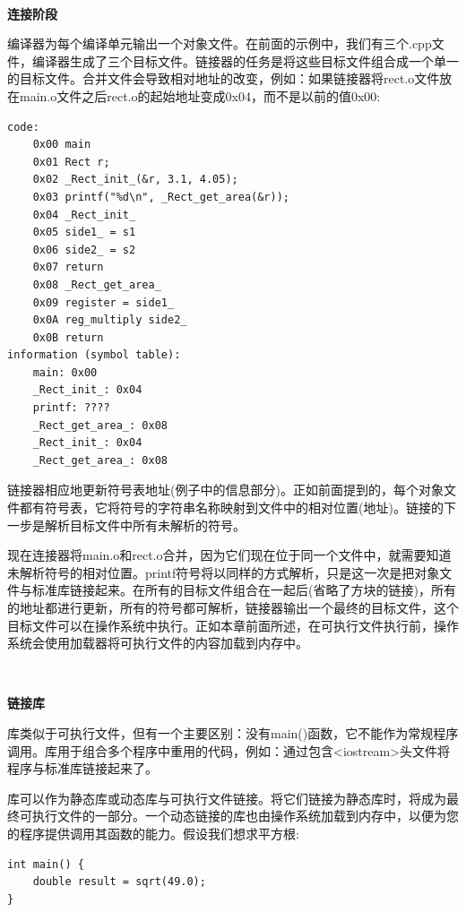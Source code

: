 \noindent\textbf{}\ \par
\textbf{连接阶段}\ \par
编译器为每个编译单元输出一个对象文件。在前面的示例中，我们有三个.cpp文件，编译器生成了三个目标文件。链接器的任务是将这些目标文件组合成一个单一的目标文件。合并文件会导致相对地址的改变，例如：如果链接器将rect.o文件放在main.o文件之后rect.o的起始地址变成0x04，而不是以前的值0x00:\par

\begin{lstlisting}[caption={}]
code:
	0x00 main
	0x01 Rect r;
	0x02 _Rect_init_(&r, 3.1, 4.05);
	0x03 printf("%d\n", _Rect_get_area(&r));
	0x04 _Rect_init_
	0x05 side1_ = s1
	0x06 side2_ = s2
	0x07 return
	0x08 _Rect_get_area_
	0x09 register = side1_
	0x0A reg_multiply side2_
	0x0B return
information (symbol table):
	main: 0x00
	_Rect_init_: 0x04
	printf: ????
	_Rect_get_area_: 0x08
	_Rect_init_: 0x04
	_Rect_get_area_: 0x08
\end{lstlisting}

链接器相应地更新符号表地址(例子中的信息部分)。正如前面提到的，每个对象文件都有符号表，它将符号的字符串名称映射到文件中的相对位置(地址)。链接的下一步是解析目标文件中所有未解析的符号。\par
现在连接器将main.o和rect.o合并，因为它们现在位于同一个文件中，就需要知道未解析符号的相对位置。printf符号将以同样的方式解析，只是这一次是把对象文件与标准库链接起来。在所有的目标文件组合在一起后(省略了方块的链接)，所有的地址都进行更新，所有的符号都可解析，链接器输出一个最终的目标文件，这个目标文件可以在操作系统中执行。正如本章前面所述，在可执行文件执行前，操作系统会使用加载器将可执行文件的内容加载到内存中。 \par

\noindent\textbf{}\ \par
\textbf{链接库}\ \par
库类似于可执行文件，但有一个主要区别：没有main()函数，它不能作为常规程序调用。库用于组合多个程序中重用的代码，例如：通过包含<iostream>头文件将程序与标准库链接起来了。 \par
库可以作为静态库或动态库与可执行文件链接。将它们链接为静态库时，将成为最终可执行文件的一部分。一个动态链接的库也由操作系统加载到内存中，以便为您的程序提供调用其函数的能力。假设我们想求平方根:\par

\begin{lstlisting}[caption={}]
int main() {
	double result = sqrt(49.0);
}
\end{lstlisting}

